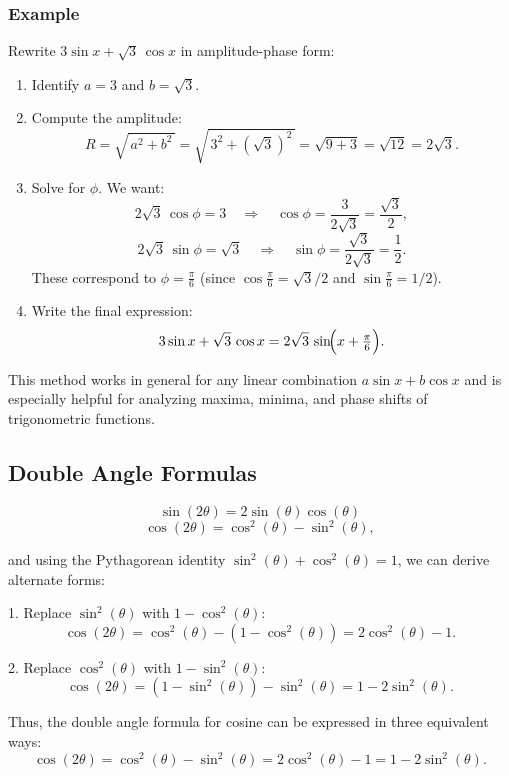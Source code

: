 \documentclass{article}
\begin{document}
\begin{multicols}{2}
\subsubsection*{Example}

Rewrite \(3 \sin x + \sqrt{3}\,\cos x\) in amplitude-phase form:

\begin{enumerate}
\item Identify \(a = 3\) and \(b = \sqrt{3}\).
\item Compute the amplitude:
  \[
    R = \sqrt{\,a^2 + b^2\,}
      = \sqrt{\,3^2 + (\sqrt{3})^2\,}
      = \sqrt{9 + 3}
      = \sqrt{12}
      = 2\sqrt{3}.
  \]
\item Solve for \(\phi\).  We want:
  \[
    2\sqrt{3}\,\cos \phi = 3
    \quad\Longrightarrow\quad
    \cos \phi = \frac{3}{2\sqrt{3}} = \frac{\sqrt{3}}{2},
  \]
  \[
    2\sqrt{3}\,\sin \phi = \sqrt{3}
    \quad\Longrightarrow\quad
    \sin \phi = \frac{\sqrt{3}}{2\sqrt{3}} = \frac{1}{2}.
  \]
  These correspond to \(\phi = \tfrac{\pi}{6}\) (since \(\cos \tfrac{\pi}{6} = \sqrt{3}/2\) and \(\sin \tfrac{\pi}{6} = 1/2\)).
\item Write the final expression:
  \[
    3 \sin x + \sqrt{3}\,\cos x
    = 2\sqrt{3}\,\sin\!\Bigl(x + \tfrac{\pi}{6}\Bigr).
  \]
\end{enumerate}

This method works in general for any linear combination \(a \sin x + b \cos x\) and is especially helpful for analyzing maxima, minima, and phase shifts of trigonometric functions.

\subsection*{Double Angle Formulas}
\[
\sin(2\theta) = 2\sin(\theta)\cos(\theta)
\]
\[
\cos(2\theta) = \cos^2(\theta) - \sin^2(\theta),
\]

and using the Pythagorean identity \(\sin^2(\theta) + \cos^2(\theta) = 1\), we can derive alternate forms:

1. Replace \(\sin^2(\theta)\) with \(1 - \cos^2(\theta)\):
\[
\cos(2\theta) = \cos^2(\theta) - (1 - \cos^2(\theta)) = 2\cos^2(\theta)-1.
\]

2. Replace \(\cos^2(\theta)\) with \(1 - \sin^2(\theta)\):
\[
\cos(2\theta) = (1 - \sin^2(\theta)) - \sin^2(\theta) = 1 - 2\sin^2(\theta).
\]

Thus, the double angle formula for cosine can be expressed in three equivalent ways:
\[
\cos(2\theta) = \cos^2(\theta) - \sin^2(\theta) = 2\cos^2(\theta)-1 = 1-2\sin^2(\theta).
\]


\end{multicols}
\end{document}
